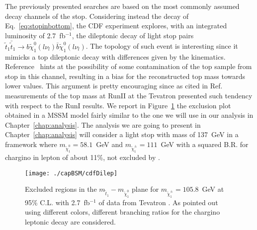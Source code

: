 The previously presented searches are based on the most commonly assumed decay channels of the stop. Considering instead the decay of Eq.~\ref{eq:stopinbottom}, the CDF experiment \cite{ivanov-2008,ivanov-2009} explores, with an integrated luminosity of 2.7~fb$^{-1}$, the dileptonic decay of light stop pairs $\tilde{t}_{1}\bar{\tilde{t}}_{1} \rightarrow b\tilde{\chi}^{0}_{1}(l\nu_l)\bar{b}\tilde{\chi}^{0}_{1}(l\nu_{l})$. The topology of such event is interesting since it mimicks a top dileptonic decay with differences given by the kinematics. Reference~\cite{ivanov-2009} hints at the possibility of some contamination of the top sample from stop in this channel, resulting in a bias for the reconstructed top mass towards lower values. This argument is pretty encouraging since as cited in Ref.~\cite{ivanov-2009} measurements of the top mass at RunII at the Tevatron presented such tendency with respect to the RunI results. We report in Figure~\ref{cdfDilep} the exclusion plot obtained in a MSSM model fairly similar to the one we will use in our analysis in Chapter~\ref{chap:analysis}. The analysis we are going to present in Chapter~\ref{chap:analysis} will consider a light stop with mass of 137~GeV in a framework where $m_{{\tilde \chi}^0_1}=58.1$~GeV and $m_{{\tilde \chi}^\pm_1}=111$~GeV with a squared B.R. for chargino in lepton of about 11\%, not excluded by \cite{ivanov-2009}. \begin{figure}[htb]\begin{center}\texttt{[image: ./capBSM/cdfDilep]}\caption{Excluded regions in the  $m_{{\tilde t}_1} - m_{{\tilde \chi}^0_1}$ plane for $m_{{\tilde \chi}^\pm_1}=105.8$~GeV at 95\% C.L. with 2.7~fb$^{-1}$ of data from Tevatron \cite{ivanov-2009}. As pointed out using different colors, different branching ratios for the chargino leptonic decay are considered.}\label{cdfDilep} \end{center}\end{figure}




